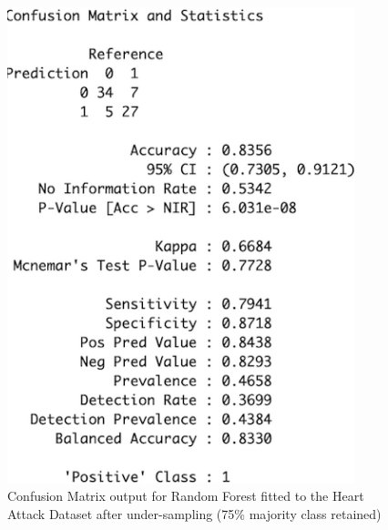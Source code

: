 \begin{figure}[!htbp]
\begin{minipage}{0.45\textwidth}
        \includegraphics[width=0.9\textwidth]{ThesisTemplate/appendix/images/Chapter5Appendix/ConfusionMatrix75/HA.png}
        \caption{Confusion Matrix output for Random Forest fitted to the Heart Attack Dataset after under-sampling (75\% majority class retained)}
        \label{fig:matrixHA75}
    \end{minipage}
\end{figure}

